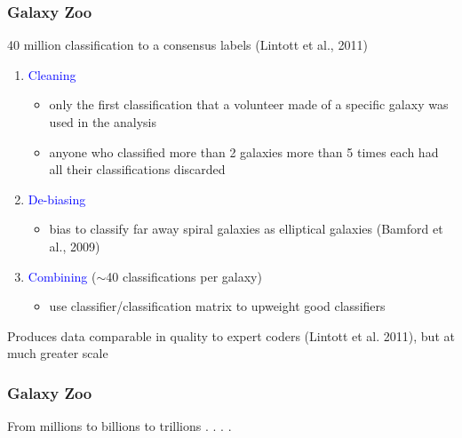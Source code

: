 \documentclass[aspectratio=169]{beamer}
\begin{document}
\begin{frame}
\frametitle{Galaxy Zoo}

40 million classification to a consensus labels (Lintott et al., 2011)
\begin{enumerate}
\item \textcolor{blue}{Cleaning} 
\begin{itemize}
\item only the first classification that a volunteer made of a specific galaxy was used in the analysis
\item anyone who classified more than 2 galaxies more than 5 times each had all their classifications discarded
\end{itemize}
\pause
\item \textcolor{blue}{De-biasing}
\begin{itemize}
\item bias to classify far away spiral galaxies as elliptical galaxies (Bamford et al., 2009)
\end{itemize}
\pause
\item \textcolor{blue}{Combining} ($\sim$40 classifications per galaxy)
\begin{itemize}
\item use classifier/classification matrix to upweight good classifiers 
\end{itemize}
\end{enumerate}
\vfill
Produces data comparable in quality to expert coders (Lintott et al. 2011), but at much greater scale

\end{frame}
\begin{frame}
\frametitle{Galaxy Zoo}

From millions to billions to trillions . . . .

\end{frame}
\end{document}
